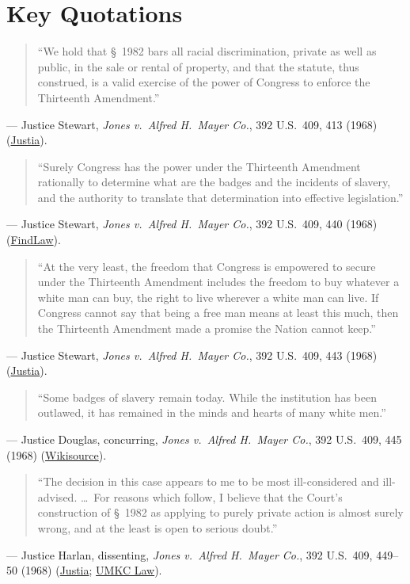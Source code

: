 \documentclass[12pt]{article}
\begin{document}
\section{Key Quotations}

\begin{quote}
``We hold that \S~1982 bars all racial discrimination, private as well as public, in the sale or rental of property, and that the statute, thus construed, is a valid exercise of the power of Congress to enforce the Thirteenth Amendment.''
\end{quote}
\noindent --- Justice Stewart, \textit{Jones v.\ Alfred H.\ Mayer Co.}, 392 U.S.\ 409, 413 (1968) (\href{https://supreme.justia.com/cases/federal/us/392/409/}{Justia}).

\begin{quote}
``Surely Congress has the power under the Thirteenth Amendment rationally to determine what are the badges and the incidents of slavery, and the authority to translate that determination into effective legislation.''
\end{quote}
\noindent --- Justice Stewart, \textit{Jones v.\ Alfred H.\ Mayer Co.}, 392 U.S.\ 409, 440 (1968) (\href{https://constitution.findlaw.com/amendment13.html}{FindLaw}).

\begin{quote}
``At the very least, the freedom that Congress is empowered to secure under the Thirteenth Amendment includes the freedom to buy whatever a white man can buy, the right to live wherever a white man can live. If Congress cannot say that being a free man means at least this much, then the Thirteenth Amendment made a promise the Nation cannot keep.''
\end{quote}
\noindent --- Justice Stewart, \textit{Jones v.\ Alfred H.\ Mayer Co.}, 392 U.S.\ 409, 443 (1968) (\href{https://supreme.justia.com/cases/federal/us/392/409/}{Justia}).

\begin{quote}
``Some badges of slavery remain today. While the institution has been outlawed, it has remained in the minds and hearts of many white men.''
\end{quote}
\noindent --- Justice Douglas, concurring, \textit{Jones v.\ Alfred H.\ Mayer Co.}, 392 U.S.\ 409, 445 (1968) (\href{https://en.wikisource.org/wiki/Jones_v._Alfred_H._Mayer_Co./Concurrence_Douglas}{Wikisource}).

\begin{quote}
``The decision in this case appears to me to be most ill-considered and ill-advised. \dots\ For reasons which follow, I believe that the Court's construction of \S~1982 as applying to purely private action is almost surely wrong, and at the least is open to serious doubt.''
\end{quote}
\noindent --- Justice Harlan, dissenting, \textit{Jones v.\ Alfred H.\ Mayer Co.}, 392 U.S.\ 409, 449--50 (1968) (\href{https://supreme.justia.com/cases/federal/us/392/409/}{Justia}; \href{http://law2.umkc.edu/faculty/projects/ftrials/conlaw/mayer.html}{UMKC Law}).
\end{document}
